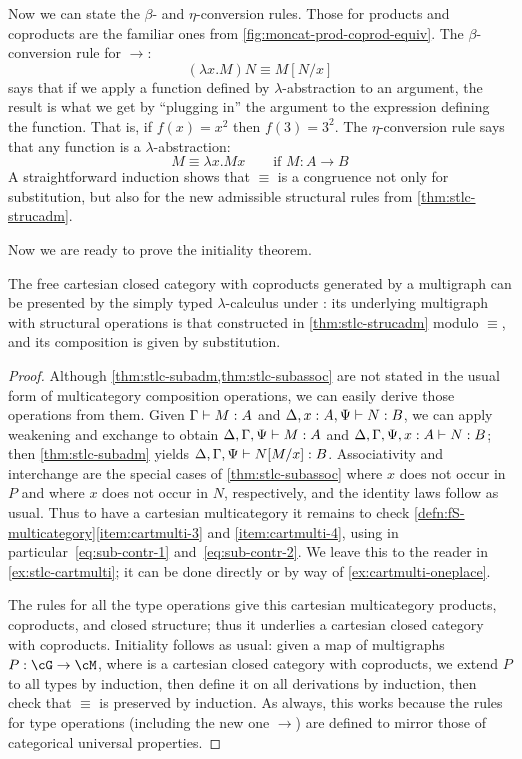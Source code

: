 Now we can state the $\beta$- and $\eta$-conversion rules.
Those for products and coproducts are the familiar ones from \cref{fig:moncat-prod-coprod-equiv}.
The $\beta$-conversion rule for $\to$:
\[ (\lambda x.M)N \equiv M[N/x]\]
says that if we apply a function defined by $\lambda$-abstraction to an argument, the result is what we get by ``plugging in'' the argument to the expression defining the function.
That is, if $f(x)=x^2$ then $f(3) = 3^2$.
The $\eta$-conversion rule says that any function is a $\lambda$-abstraction:
\[  M \equiv \lambda x.Mx \qquad \text{if } M:A\to B\]
A straightforward induction shows that $\equiv$ is a congruence not only for substitution, but also for the new admissible structural rules from \cref{thm:stlc-strucadm}.

Now we are ready to prove the initiality theorem.

\begin{thm}\label{thm:stlc-initial}
  The free cartesian closed category with coproducts generated by a multigraph \cG can be presented by the simply typed $\lambda$-calculus under \cG: its underlying multigraph with structural operations is that constructed in \cref{thm:stlc-strucadm} modulo $\equiv$, and its composition is given by substitution.
\end{thm}
\begin{proof}
  Although \cref{thm:stlc-subadm,thm:stlc-subassoc} are not stated in the usual form of multicategory composition operations, we can easily derive those operations from them.
  Given $\Gamma\vdash M:A$ and $\Delta,x:A,\Psi\vdash N:B$, we can apply weakening and exchange to obtain $\Delta,\Gamma,\Psi\vdash M:A$ and $\Delta,\Gamma,\Psi,x:A\vdash N:B$; then \cref{thm:stlc-subadm} yields $\Delta,\Gamma,\Psi\vdash N[M/x]:B$.
  Associativity and interchange are the special cases of \cref{thm:stlc-subassoc} where $x$ does not occur in $P$ and where $x$ does not occur in $N$, respectively, and the identity laws follow as usual.
  Thus to have a cartesian multicategory it remains to check \cref{defn:fS-multicategory}\ref{item:cartmulti-3} and \ref{item:cartmulti-4}, using in particular~\eqref{eq:sub-contr-1} and~\eqref{eq:sub-contr-2}.
  We leave this to the reader in \cref{ex:stlc-cartmulti}; it can be done directly or by way of \cref{ex:cartmulti-oneplace}.

  The rules for all the type operations give this cartesian multicategory products, coproducts, and closed structure; thus it underlies a cartesian closed category with coproducts.
  Initiality follows as usual: given a map of multigraphs $P:\cG\to \cM$, where \cM is a cartesian closed category with coproducts, we extend $P$ to all types by induction, then define it on all derivations by induction, then check that $\equiv$ is preserved by induction.
  As always, this works because the rules for type operations (including the new one $\to$) are defined to mirror those of categorical universal properties.
\end{proof}

